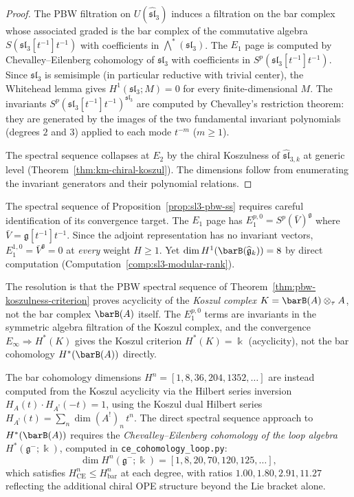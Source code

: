 \begin{proof}
The PBW filtration on $U(\widehat{\mathfrak{sl}}_3)$ induces a filtration
on the bar complex whose associated graded is the bar complex of the
commutative algebra $S(\mathfrak{sl}_3[t^{-1}]t^{-1})$ with coefficients in
$\bigwedge^*(\mathfrak{sl}_3)$.  The $E_1$ page is computed by
Chevalley--Eilenberg cohomology of $\mathfrak{sl}_3$ with coefficients in
$S^p(\mathfrak{sl}_3[t^{-1}]t^{-1})$.  Since $\mathfrak{sl}_3$ is semisimple
(in particular reductive with trivial center), the Whitehead lemma gives
$H^1(\mathfrak{sl}_3; M) = 0$ for every finite-dimensional $M$.  The invariants
$S^p(\mathfrak{sl}_3[t^{-1}]t^{-1})^{\mathfrak{sl}_3}$ are computed by
Chevalley's restriction theorem: they are generated by the images of the
two fundamental invariant polynomials (degrees $2$ and $3$) applied to
each mode $t^{-m}$ ($m \geq 1$).

The spectral sequence collapses at $E_2$ by the chiral Koszulness of
$\widehat{\mathfrak{sl}}_{3,k}$ at generic level
(Theorem~\ref{thm:km-chiral-koszul}).  The dimensions follow from
enumerating the invariant generators and their polynomial relations.
\end{proof}

\begin{remark}
\label{rem:pbw-convergence-target}
The spectral sequence of Proposition~\ref{prop:sl3-pbw-ss} requires
careful identification of its convergence target.  The $E_1$ page
has $E_1^{p,0} = S^p(\bar{V})^{\mathfrak{g}}$ where
$\bar{V} = \mathfrak{g}[t^{-1}]t^{-1}$.
Since the adjoint representation has no invariant vectors,
$E_1^{1,0} = \bar{V}^{\mathfrak{g}} = 0$
at \emph{every} weight $H \geq 1$.  Yet $\dim H^1(\barB(\widehat{\mathfrak{g}}_k)) = 8$
by direct computation (Computation~\ref{comp:sl3-modular-rank}).

The resolution is that the PBW spectral sequence of
Theorem~\ref{thm:pbw-koszulness-criterion} proves acyclicity
of the \emph{Koszul complex} $K = \barB(A) \otimes_\tau A$,
not the bar complex $\barB(A)$ itself.  The $E_1^{p,0}$ terms
are invariants in the symmetric algebra filtration of the
Koszul complex, and the convergence
$E_\infty \Rightarrow H^*(K)$ gives the Koszul criterion
$H^*(K) = \Bbbk$ (acyclicity), not the bar cohomology
$H^*(\barB(A))$ directly.

The bar cohomology dimensions $H^n = [1, 8, 36, 204, 1352, \ldots]$
are instead computed from the Koszul acyclicity via the Hilbert
series inversion $H_A(t) \cdot H_{A^!}(-t) = 1$, using the
Koszul dual Hilbert series
$H_{A^!}(t) = \sum_n \dim(A^!)_n \, t^n$.
The direct spectral sequence approach to $H^*(\barB(A))$
requires the \emph{Chevalley--Eilenberg cohomology of the
loop algebra} $H^*(\mathfrak{g}^-; \Bbbk)$, computed in
\texttt{ce\_cohomology\_loop.py}:
\[
\dim H^n(\mathfrak{g}^-; \Bbbk) =
[1, 8, 20, 70, 120, 125, \ldots],
\]
which satisfies $H^n_{\mathrm{CE}} \leq H^n_{\mathrm{bar}}$
at each degree, with ratios $1.00, 1.80, 2.91, 11.27$ reflecting the
additional chiral OPE structure beyond the Lie bracket alone.
\end{remark}

